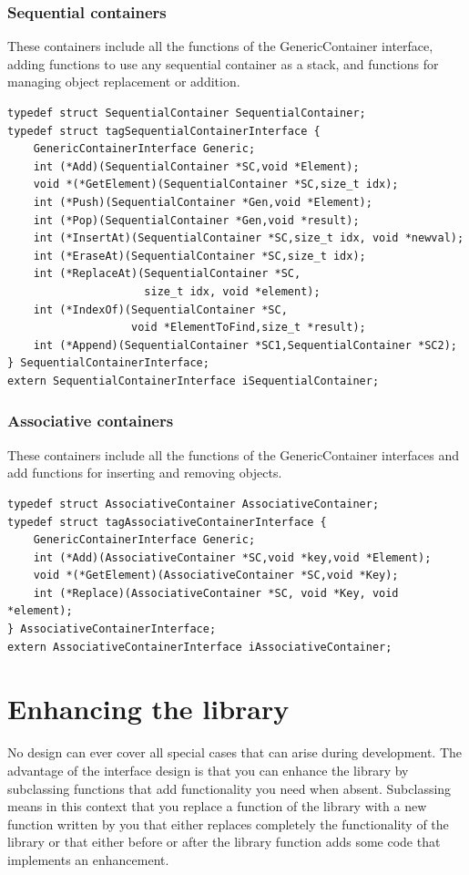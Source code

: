 \documentclass[12pt,a4paper,openany]{memoir} %
\begin{document}
{{\subsection{Sequential containers}
These containers include all the functions of the GenericContainer interface, adding functions to use any sequential container as a stack, and functions for managing object replacement or addition.
\begin{verbatim}
typedef struct SequentialContainer SequentialContainer;
typedef struct tagSequentialContainerInterface {
    GenericContainerInterface Generic;
    int (*Add)(SequentialContainer *SC,void *Element);
    void *(*GetElement)(SequentialContainer *SC,size_t idx);
    int (*Push)(SequentialContainer *Gen,void *Element);
    int (*Pop)(SequentialContainer *Gen,void *result);
    int (*InsertAt)(SequentialContainer *SC,size_t idx, void *newval);
    int (*EraseAt)(SequentialContainer *SC,size_t idx);
    int (*ReplaceAt)(SequentialContainer *SC, 
                     size_t idx, void *element);
    int (*IndexOf)(SequentialContainer *SC,
                   void *ElementToFind,size_t *result);
    int (*Append)(SequentialContainer *SC1,SequentialContainer *SC2);
} SequentialContainerInterface;
extern SequentialContainerInterface iSequentialContainer;
\end{verbatim}
\subsection{Associative containers}
These containers include all the functions of the GenericContainer interfaces and add functions for inserting and removing objects.
\begin{verbatim}
typedef struct AssociativeContainer AssociativeContainer;
typedef struct tagAssociativeContainerInterface {
    GenericContainerInterface Generic;
    int (*Add)(AssociativeContainer *SC,void *key,void *Element);
    void *(*GetElement)(AssociativeContainer *SC,void *Key);
    int (*Replace)(AssociativeContainer *SC, void *Key, void *element);
} AssociativeContainerInterface;
extern AssociativeContainerInterface iAssociativeContainer;
\end{verbatim} 
\chapter{Enhancing the library}
No design can ever cover all special cases that can arise during development. The advantage of the interface design is that you can enhance the library by subclassing functions that add functionality you need when absent.
Subclassing means in this context that you replace a function of the library with a new function written by you that either replaces completely the functionality of the library or that either before or after the library function adds some code that implements an enhancement.

}}
\end{document}
